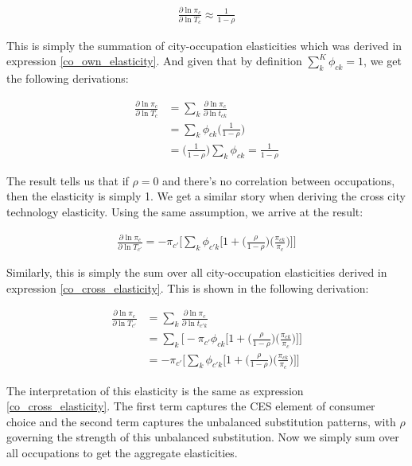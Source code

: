 \documentclass[10pt]{article}
\begin{document}
\begin{align*}
    \frac{\partial \ln \pi_c}{\partial \ln T_c} \approx \frac{1}{1 - \rho}
\end{align*}

This is simply the summation of city-occupation elasticities which was derived in expression \ref{co_own_elasticity}. And given that by definition $\sum \limits_k^K \phi_{ck} = 1$, we get the following derivations:

\begin{align*}
    \frac{\partial{\ln{\pi_{c}}}}{\partial\ln{T_{c}}} & = \sum\limits_{k}\frac{\partial{\ln{\pi_{c}}}}{\partial\ln{t_{ck}}} \\ &= \sum\limits_{k}\phi_{ck}\Bigg(\frac{1}{1-\rho}\Bigg) \\ &= \Bigg(\frac{1}{1-\rho}\Bigg)\sum\limits_{k}\phi_{ck} = \frac{1}{1-\rho}
\end{align*}

The result tells us that if $\rho = 0$ and there's no correlation between occupations, then the elasticity is simply 1. We get a similar story when deriving the cross city technology elasticity. Using the same assumption, we arrive at the result:

\begin{align}
    \frac{\partial\ln{\pi_{c}}}{\partial\ln{T_{c'}}} = -\pi_{c'}\Bigg[\sum\limits_{k}\phi_{{c'}k}\Big[1+\Big(\frac{\rho}{1-\rho}\Big)\Big(\frac{\pi_{ck}}{\pi_{c}}\Big)\Big]\Bigg]
\end{align}

Similarly, this is simply the sum over all city-occupation elasticities derived in expression \ref{co_cross_elasticity}. This is shown in the following derivation:

\begin{align*}
    \frac{\partial\ln{\pi_{c}}}{\partial\ln{T_{c'}}} & = \sum\limits_{k}\frac{\partial\ln{\pi_{c}}}{\partial\ln{t_{{c'}k}}} \\ &= \sum\limits_{k}\Bigg[-{\pi_{c'}}{\phi_{ck}}\Big[1+\Big(\frac{\rho}{1-\rho}\Big)\Big(\frac{\pi_{ck}}{\pi_{c}}\Big)\Big]\Bigg]\\ &= -\pi_{c'}\Bigg[\sum\limits_{k}\phi_{{c'}k}\Big[1+\Big(\frac{\rho}{1-\rho}\Big)\Big(\frac{\pi_{ck}}{\pi_{c}}\Big)\Big]\Bigg]
\end{align*}

The interpretation of this elasticity is the same as expression \ref{co_cross_elasticity}. The first term captures the CES element of consumer choice and the second term captures the unbalanced substitution patterns, with $\rho$ governing the strength of this unbalanced substitution. Now we simply sum over all occupations to get the aggregate elasticities.
\end{document}
